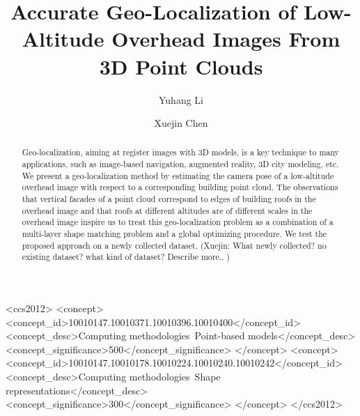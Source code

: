 \documentclass[sigconf,authorversion]{acmart}
\newcommand{\cxj}[1]{\textcolor[rgb]{1.00,0.00,0.00}{(Xuejin: #1)}}
\begin{document}
\title{Accurate Geo-Localization of Low-Altitude Overhead Images From 3D Point Clouds}

\author{Yuhang Li}

\author{Xuejin Chen}
 

\begin{abstract}

Geo-localization, aiming at register images with 3D models, is a key technique to many applications, such as image-based navigation, augmented reality, 3D city modeling, etc.
%
We present a geo-localization method by estimating the camera pose of a low-altitude overhead image with respect to a corresponding building point cloud. 
%
The observations that vertical facades of a point cloud correspond to edges of building roofs in the overhead image and that roofs at different altitudes are of different scales in the overhead image inspire us to treat this geo-localization problem as a combination of a multi-layer shape matching problem and a global optimizing procedure. 
%
We test the proposed approach on a newly collected dataset. \cxj{What newly collected? no existing dataset? what kind of dataset? Describe more.. }

\end{abstract}

%
%
\begin{CCSXML}
	<ccs2012>
	<concept>
	<concept_id>10010147.10010371.10010396.10010400</concept_id>
	<concept_desc>Computing methodologies~Point-based models</concept_desc>
	<concept_significance>500</concept_significance>
	</concept>
	<concept>
	<concept_id>10010147.10010178.10010224.10010240.10010242</concept_id>
	<concept_desc>Computing methodologies~Shape representations</concept_desc>
	<concept_significance>300</concept_significance>
	</concept>
	</ccs2012>
\end{CCSXML}






 
\end{document}
